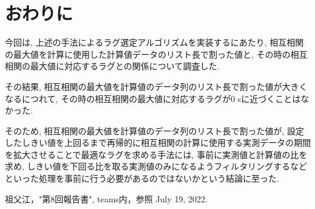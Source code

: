 \documentclass[a4j,12pt,]{jarticle}
\begin{document}
\section{おわりに}
今回は, 上述の手法によるラグ選定アルゴリズムを実装するにあたり, 相互相関の最大値を計算に使用した計算値データのリスト長で割った値と, その時の相互相関の最大値に対応するラグとの関係について調査した.

その結果, 相互相関の最大値を計算値のデータ列のリスト長で割った値が大きくなるにつれて, その時の相互相関の最大値に対応するラグが0 \si{\second}に近づくことはなかった.

そのため, 相互相関の最大値を計算値のデータ列のリスト長で割った値が, 設定したしきい値を上回るまで再帰的に相互相関の計算に使用する実測データの期間を拡大させることで最適なラグを求める手法には, 事前に実測値と計算値の比を求め, しきい値を下回る比を取る実測値のみになるようフィルタリングするなどといった処理を事前に行う必要があるのではないかという結論に至った.

\begin{thebibliography}{5}
  祖父江，"第8回報告書", teams内，参照 July 19, 2022.
\end{thebibliography}
\end{document}
